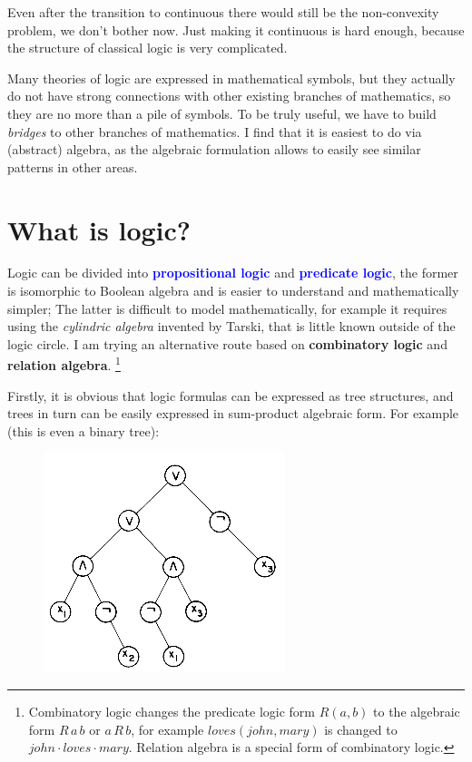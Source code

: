 \documentclass[12pt]{article}
\newcommand{\concept}[1]{\textbf{\textcolor{blue}{#1}}}
\begin{document}
Even after the transition to continuous there would still be the non-convexity problem, we don't bother now.  Just making it continuous is hard enough, because the structure of classical logic is very complicated.

Many theories of logic are expressed in mathematical symbols, but they actually do not have strong connections with other existing branches of mathematics, so they are no more than a pile of symbols.  To be truly useful, we have to build \textit{bridges} to other branches of mathematics.  I find that it is easiest to do via (abstract) algebra, as the algebraic formulation allows to easily see similar patterns in other areas.

\section{What is logic?}

Logic can be divided into \concept{propositional logic} and \concept{predicate logic}, the former is isomorphic to Boolean algebra and is easier to understand and mathematically simpler;  The latter is difficult to model mathematically, for example it requires using the \textit{cylindric algebra} invented by Tarski, that is little known outside of the logic circle.  I am trying an alternative route based on \textbf{combinatory logic} and \textbf{relation algebra}. \footnote{Combinatory logic changes the predicate logic form $R(a, b)$ to the algebraic form $R \,a\, b$ or $a \,R\, b$, for example $loves(john, mary)$ is changed to $john \cdot loves \cdot mary$.  Relation algebra is a special form of combinatory logic.}


Firstly, it is obvious that logic formulas can be expressed as tree structures, and trees in turn can be easily expressed in sum-product algebraic form.  For example (this is even a binary tree):
\begin{figure}[H]
\centering
\includegraphics[scale=0.5]{logic-formula-tree.jpg}
\end{figure}
\end{document}
